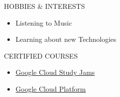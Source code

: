 \documentclass{resume}
\begin{document}
\begin{rSection}{HOBBIES \& INTERESTS}
\begin{itemize}
    \item Listening to Music
    \item Learning about new Technologies
\end{itemize}
\end{rSection}
\vspace{0.8em}

\begin{rSection}{CERTIFIED COURSES}
\begin{itemize}
    \item \href{https://www.cloudskillsboost.google/public_profiles/dcbf7583-1c68-4d5c-a408-9ad45d93130d}{Google Cloud Study Jams}
\end{itemize}
\begin{itemize}
    \item \href{https://www.cloudskillsboost.google/public_profiles/7594501c-7933-4fba-be9b-2a92ca3ee410}{Google Cloud Platform}
\end{itemize}
\end{rSection}
\end{document}
